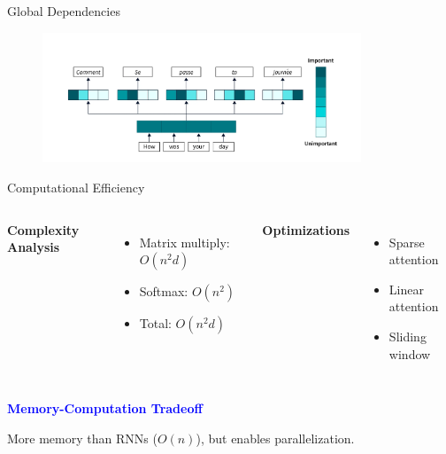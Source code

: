 \documentclass[serif, aspectratio=169]{beamer}
\begin{document}
\begin{frame}{Global Dependencies}
        \begin{figure}
        \centering
        \includegraphics[width=0.85\textwidth]{pic/attention-weights.png}
    \end{figure}
\vspace{7pt}   
\vfill
{}
\end{frame}

\begin{frame}{Computational Efficiency}
    \begin{columns}
        \textbf{Complexity Analysis}
        \begin{itemize}
            \item Matrix multiply: $O(n^2d)$
            \item Softmax: $O(n^2)$
            \item Total: $O(n^2d)$
        \end{itemize}
        
        \textbf{Optimizations}
        \begin{itemize}
            \item Sparse attention
            \item Linear attention
            \item Sliding window
        \end{itemize}
    \end{columns}

    \vspace{0.5cm}
    \textcolor{blue}{\textbf{Memory-Computation Tradeoff}}
    
    \vspace{0.2cm}
    More memory than RNNs ($O(n)$), but enables parallelization.
    
\end{frame}
\end{document}
